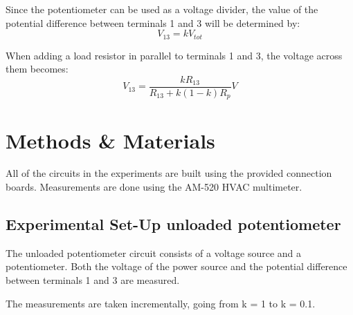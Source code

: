 \documentclass[a4paper]{article}
\begin{document}
Since the potentiometer can be used as a voltage divider, the value of the
potential difference between terminals 1 and 3 will be determined by:
\begin{equation}
    V_{13} = k V_{tot}
\end{equation} 

When adding a load resistor in parallel to terminals 1 and 3, the voltage across
them becomes:
\begin{equation}
    V_{13} = \frac{kR_{13}}{R_{13}+k(1-k)R_p} V
\end{equation}
\section{Methods \& Materials}
All of the circuits in the experiments are built using the provided connection
boards. Measurements are done using the AM-520 HVAC multimeter.
\subsection{Experimental Set-Up unloaded potentiometer}
The unloaded potentiometer circuit consists of a voltage source and a
potentiometer. Both the voltage of the power source and the potential difference
between terminals 1 and 3 are measured.

The measurements are taken
incrementally, going from k = 1 to k = 0.1.
\end{document}
